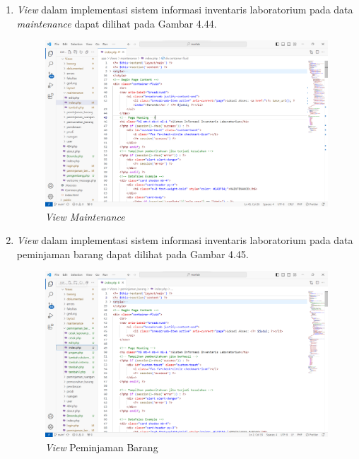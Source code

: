 \begin{enumerate}
  \item \textit{View} dalam implementasi sistem informasi inventaris laboratorium pada data \textit{maintenance} dapat dilihat pada Gambar 4.44.
        \begin{figure}
          \centering
          \includegraphics[width=0.82\linewidth]{konten//gambar/view maintenance.png}
          \caption{\textit{View Maintenance}}
          \label{fig:enter-label}
        \end{figure}

  \item \textit{View} dalam implementasi sistem informasi inventaris laboratorium pada data peminjaman barang dapat dilihat pada Gambar 4.45.
        \begin{figure}
          \centering
          \includegraphics[width=0.82\linewidth]{konten//gambar/view peminjaman_barang.png}
          \caption{\textit{View} Peminjaman Barang}
          \label{fig:enter-label}
        \end{figure}


\end{enumerate}
